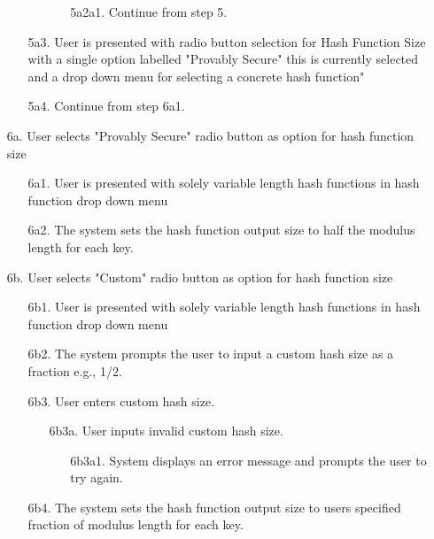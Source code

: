 \documentclass[]{final_report}
\theoremstyle{definition}
\begin{document}
\begin{enumerate}
\begin{enumerate}
\begin{enumerate}
\begin{enumerate}
        \item[5a2a1.] Continue from step 5.
            \end{enumerate}
    \end{enumerate}
    \item[5a3.]  User is presented with radio button selection for Hash Function Size with a single option labelled "Provably Secure" this is currently selected and a drop down menu for selecting a concrete hash function"
     \item[5a4.]  Continue from step 6a1.
    \end{enumerate}
       \item[6a.] User selects "Provably Secure" radio button as option for hash function size
    \begin{enumerate}
        \item[6a1.] User is presented with solely variable length hash functions in hash function drop down menu
         \item[6a2.] The system sets the hash function output size to half the modulus length for each key.
    \end{enumerate}
         \item[6b.] User selects "Custom" radio button as option for hash function size
    \begin{enumerate}
        \item[6b1.] User is presented with solely variable length hash functions in hash function drop down menu
        \item[6b2.] The system prompts the user to input a custom hash size as a fraction e.g., 1/2.
         \item[6b3.] User enters custom hash size.
             \begin{enumerate}
             \item[6b3a.] User inputs invalid custom hash size.
    \begin{enumerate}
        \item[6b3a1.] System displays an error message and prompts the user to try again.
    \end{enumerate}
        \end{enumerate}
         \item[6b4.] The system sets the hash function output size to users specified fraction of modulus length for each key.
    \end{enumerate}
   

\end{enumerate}
\end{document}

